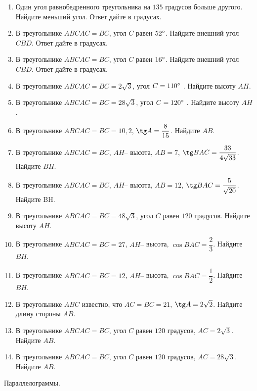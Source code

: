 \documentclass[12pt, a4paper]{article}
\begin{document}
\begin{enumerate}
		\item Один угол равнобедренного треугольника на \( 135 \) градусов больше другого. Найдите меньший угол. Ответ дайте в градусах.
		\item В треугольнике \(ABC AC=BC\), угол \( C \) равен \( 52\degree \). Найдите внешний угол \( CBD \). Ответ дайте в градусах.
		\item В треугольнике \(ABC AC=BC\), угол \( C \) равен \( 16\degree \). Найдите внешний угол \( CBD \). Ответ дайте в градусах.
		\item В треугольнике \(ABC AC=BC=2\sqrt{3} \), угол \( C =110\degree\) . Найдите высоту \( AH \).
		\item В треугольнике \(ABC AC=BC=28\sqrt{3} \), угол \( C =120\degree\) . Найдите высоту \( AH \).
		\item В треугольнике \(ABC AC=BC=10,2 \),  \( \tg A=\dfrac{8}{15} \).  Найдите \( AB \).
		\item В треугольнике \( ABC AC = BC \), \( AH – \) высота, \(AB=7\),  \( \tg BAC=\dfrac{33}{4\sqrt{33}} \).  Найдите \( BH \).
		\item В треугольнике \( ABC AC = BC \), \( AH – \) высота, \( AB=12 \),  \( \tg BAC=\dfrac{5}{\sqrt{20}} \).  Найдите BH.
		\item В треугольнике \( ABC AC = BC = 48\sqrt{3} \), угол \( C \) равен \( 120  \) градусов. Найдите высоту \( AH \).
		\item В треугольнике \( ABC AC = BC = 27 \), \( AH – \) высота,  \( \cos BAC=\dfrac{2}{3} \).  Найдите \( BH \).
		\item В треугольнике \( ABC AC = BC = 12 \), \( AH – \) высота,  \( \cos BAC=\dfrac{1}{2} \).  Найдите \( BH \).
		\item В треугольнике \(ABC\) известно, что \(AC=BC=21\),  \( \tg A=2\sqrt{2} \). Найдите длину стороны \( AB \).
		\item В треугольнике \( ABC AC = BC \), угол \( C \) равен \( 120 \) градусов, \( AC = 2\sqrt{3} \). Найдите \( AB \).
		\item В треугольнике \( ABC AC = BC \), угол \( C \) равен \( 120 \) градусов, \( AC =28\sqrt{3}  \). Найдите \( AB \).
	\end{enumerate}
		Параллелограммы.
\end{document}
